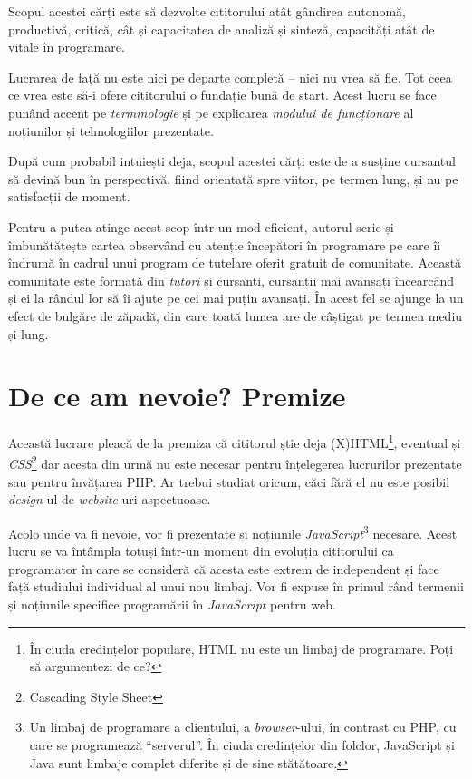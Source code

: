 Scopul acestei cărți este să dezvolte cititorului atât gândirea autonomă,
productivă, critică, cât și capacitatea de analiză și sinteză, capacități atât
de vitale în programare.

Lucrarea de față nu este nici pe departe completă -- nici nu vrea să fie.  Tot
ceea ce vrea este să-i ofere cititorului o fundație bună de start. Acest lucru
se face punând accent pe \textit{terminologie} și pe explicarea \textit{modului
de funcționare} al noțiunilor și tehnologiilor prezentate.

După cum probabil intuiești deja, scopul acestei cărți este de a susține
cursantul să devină bun în perspectivă, fiind orientată spre viitor, pe termen
lung, și nu pe satisfacții de moment.

Pentru a putea atinge acest scop într-un mod eficient, autorul scrie și
îmbunătățește cartea observând cu atenție începători în programare pe care îi
îndrumă în cadrul unui program de tutelare oferit gratuit de comunitate.
Această comunitate este formată din \textit{tutori} și cursanți, cursanții mai
avansați încearcând și ei la rândul lor să îi ajute pe cei mai puțin avansați.
În acest fel se ajunge la un efect de bulgăre de zăpadă, din care toată lumea
are de câștigat pe termen mediu și lung.

\section*{De ce am nevoie? Premize}
{}

Această lucrare pleacă de la premiza că cititorul știe deja
(X)HTML\footnote{În ciuda credințelor populare, HTML nu este un limbaj de
programare. Poți să argumentezi de ce?}, eventual și
\textsl{CSS}\footnote{Cascading Style Sheet}
%
%
%
%
dar acesta din urmă nu este necesar pentru
înțelegerea lucrurilor prezentate sau pentru învățarea PHP. Ar trebui studiat
oricum, căci fără el nu este posibil
\textsl{design}-ul
%
%
de \textit{website}-uri aspectuoase.

Acolo unde va fi nevoie, vor fi prezentate și noțiunile
\textsl{JavaScript}\footnote{Un
limbaj de programare a clientului, a \textsl{browser}-ului, în contrast cu PHP,
cu care se programează ``serverul''.  În ciuda credințelor din folclor,
JavaScript și Java sunt limbaje complet diferite și de sine stătătoare.}
necesare. Acest lucru se va întâmpla totuși într-un moment din evoluția
cititorului ca programator în care se consideră că acesta este extrem de
independent și face față studiului individual al unui nou limbaj. Vor fi expuse
în primul rând termenii și noțiunile specifice programării în \textit{JavaScript} pentru
web.

